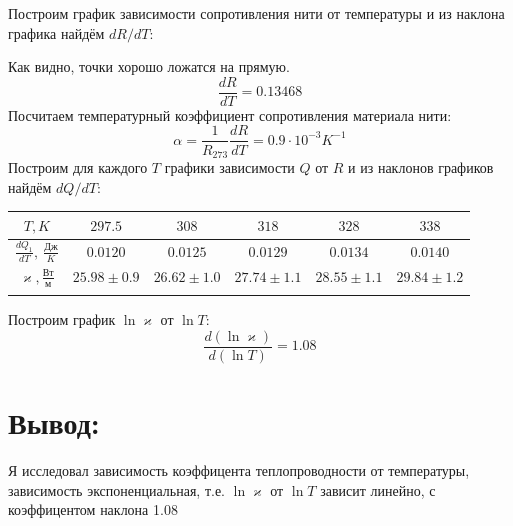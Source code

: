 \documentclass[a4paper,12pt]{article}
\begin{document}
Построим график зависимости сопротивления нити от температуры и из наклона графика найдём $dR/dT$:

Как видно, точки хорошо ложатся на прямую.
\[
  \frac{dR}{dT} = 0.13468
\]
Посчитаем температурный коэффициент сопротивления материала нити:
\[
  \alpha = \frac{1}{R_{273}} \frac{dR}{dT} = 0.9 \cdot 10^{-3} K^{-1}
\]
Построим для каждого $T$ графики зависимости $Q$ от $R$ и из наклонов графиков найдём $dQ/dT$:

\begin{tabular}{|c|c|c|c|c|c|}
  \hline
  $T, K$                                  & $297.5$         & $308$           & $318$           & $328$           & $338$           \\\hline
  $\frac{dQ_1}{dT},\ \frac{\text{Дж}}{K}$ & $0.0120$        & $0.0125$        & $0.0129$        & $0.0134$        & $0.0140$        \\\hline
  $\varkappa, \frac{\text{Вт}}{\text{м}}$ & $25.98 \pm 0.9$ & $26.62 \pm 1.0$ & $27.74 \pm 1.1$ & $28.55 \pm 1.1$ & $29.84 \pm 1.2$ \\\hline
  \\
\end{tabular}
Построим график $\ln\varkappa$ от $\ln T$:
\[
  \frac{d\left(\ln \varkappa\right)}{d\left(\ln T\right)} = 1.08
\]
\section{Вывод:}
Я исследовал зависимость коэффицента теплопроводности от температуры, зависимость экспоненциальная, т.е. $\ln\varkappa$ от $\ln T$ зависит линейно, с коэффицентом наклона 1.08
\end{document}
